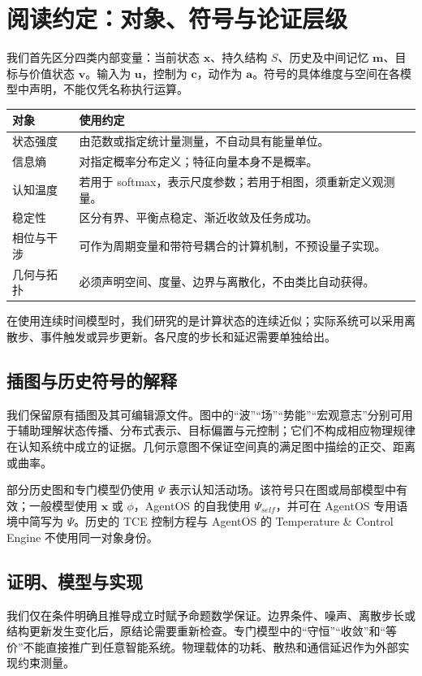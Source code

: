\chapter*{阅读约定：对象、符号与论证层级}
\label{front:reading_conventions}
我们首先区分四类内部变量：当前状态 $\mathbf{x}$、持久结构 $S$、历史及中间记忆 $\mathbf{m}$、目标与价值状态 $\mathbf{v}$。输入为 $\mathbf{u}$，控制为 $\mathbf{c}$，动作为 $\mathbf{a}$。符号的具体维度与空间在各模型中声明，不能仅凭名称执行运算。

\begin{table}[htbp]\centering
\begin{tabularx}{\textwidth}{l X}
\toprule 对象 & 使用约定 \\\midrule
状态强度 & 由范数或指定统计量测量，不自动具有能量单位。\\
信息熵 & 对指定概率分布定义；特征向量本身不是概率。\\
认知温度 & 若用于 softmax，表示尺度参数；若用于相图，须重新定义观测量。\\
稳定性 & 区分有界、平衡点稳定、渐近收敛及任务成功。\\
相位与干涉 & 可作为周期变量和带符号耦合的计算机制，不预设量子实现。\\
几何与拓扑 & 必须声明空间、度量、边界与离散化，不由类比自动获得。\\
\bottomrule\end{tabularx}\end{table}

在使用连续时间模型时，我们研究的是计算状态的连续近似；实际系统可以采用离散步、事件触发或异步更新。各尺度的步长和延迟需要单独给出。

\section*{插图与历史符号的解释}
我们保留原有插图及其可编辑源文件。图中的“波”“场”“势能”“宏观意志”分别可用于辅助理解状态传播、分布式表示、目标偏置与元控制；它们不构成相应物理规律在认知系统中成立的证据。几何示意图不保证空间真的满足图中描绘的正交、距离或曲率。

部分历史图和专门模型仍使用 $\Psi$ 表示认知活动场。该符号只在图或局部模型中有效；一般模型使用 $\mathbf{x}$ 或 $\phi$，AgentOS 的自我使用 $\Psi_{self}$，并可在 AgentOS 专用语境中简写为 $\Psi$。历史的 TCE 控制方程与 AgentOS 的 Temperature \& Control Engine 不使用同一对象身份。

\section*{证明、模型与实现}
我们仅在条件明确且推导成立时赋予命题数学保证。边界条件、噪声、离散步长或结构更新发生变化后，原结论需要重新检查。专门模型中的“守恒”“收敛”和“等价”不能直接推广到任意智能系统。物理载体的功耗、散热和通信延迟作为外部实现约束测量。

